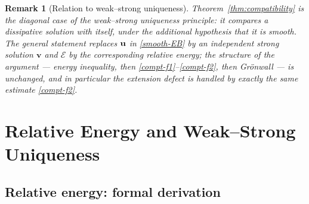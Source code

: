 \documentclass[12pt,a4paper,twoside]{article}
\newcommand{\vu}{\vc{u}}
\newcommand{\vc}[1]{{\bf #1}}
\newtheorem{rmk}{Remark}
\numberwithin{equation}{section}%
\begin{document}
\begin{rmk}[Relation to weak--strong uniqueness]\label{rem:compat-vs-ws}
	Theorem~\ref{thm:compatibility} is the diagonal case of the weak--strong uniqueness principle: it compares a dissipative solution with \emph{itself}, under the additional hypothesis that it is smooth. The general statement replaces $\vu$ in \eqref{smooth-EB} by an independent strong solution $\mathbf v$ and $\mathcal E$ by the corresponding relative energy; the structure of the argument --- energy inequality, then \eqref{compt-f1}--\eqref{compt-f2}, then Gr\"onwall --- is unchanged, and in particular the extension defect is handled by exactly the same estimate \eqref{compt-f2}. 
\end{rmk}
	
	
	\section{Relative Energy and Weak--Strong Uniqueness}
	\label{sec:relative}
	
\subsection{Relative energy: formal derivation}
\end{document}
